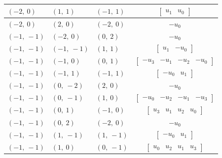 \documentclass[11pt]{article}
\theoremstyle{definition}
\begin{document}
\begin{longtable}{|l|l|l|c|}
    \hline
    $\left( -2, \  0\right)$ & $\left( 1, \  1\right)$ & $\left( -1, \  1\right)$ & $\left[\begin{matrix}u_{1} & u_{0}\end{matrix}\right]$ \\
    \hline
    $\left( -2, \  0\right)$ & $\left( 2, \  0\right)$ & $\left( -2, \  0\right)$ & $- u_{0}$ \\
    \hline
    $\left( -1, \  -1\right)$ & $\left( -2, \  0\right)$ & $\left( 0, \  2\right)$ & $- u_{0}$ \\
    \hline
    $\left( -1, \  -1\right)$ & $\left( -1, \  -1\right)$ & $\left( 1, \  1\right)$ & $\left[\begin{matrix}u_{1} & - u_{0}\end{matrix}\right]$ \\
    \hline
    $\left( -1, \  -1\right)$ & $\left( -1, \  0\right)$ & $\left( 0, \  1\right)$ & $\left[\begin{matrix}- u_{3} & - u_{1} & - u_{2} & - u_{0}\end{matrix}\right]$ \\
    \hline
    $\left( -1, \  -1\right)$ & $\left( -1, \  1\right)$ & $\left( -1, \  1\right)$ & $\left[\begin{matrix}- u_{0} & u_{1}\end{matrix}\right]$ \\
    \hline
    $\left( -1, \  -1\right)$ & $\left( 0, \  -2\right)$ & $\left( 2, \  0\right)$ & $- u_{0}$ \\
    \hline
    $\left( -1, \  -1\right)$ & $\left( 0, \  -1\right)$ & $\left( 1, \  0\right)$ & $\left[\begin{matrix}- u_{0} & - u_{2} & - u_{1} & - u_{3}\end{matrix}\right]$ \\
    \hline
    $\left( -1, \  -1\right)$ & $\left( 0, \  1\right)$ & $\left( -1, \  0\right)$ & $\left[\begin{matrix}u_{3} & u_{1} & u_{2} & u_{0}\end{matrix}\right]$ \\
    \hline
    $\left( -1, \  -1\right)$ & $\left( 0, \  2\right)$ & $\left( -2, \  0\right)$ & $- u_{0}$ \\
    \hline
    $\left( -1, \  -1\right)$ & $\left( 1, \  -1\right)$ & $\left( 1, \  -1\right)$ & $\left[\begin{matrix}- u_{0} & u_{1}\end{matrix}\right]$ \\
    \hline
    $\left( -1, \  -1\right)$ & $\left( 1, \  0\right)$ & $\left( 0, \  -1\right)$ & $\left[\begin{matrix}u_{0} & u_{2} & u_{1} & u_{3}\end{matrix}\right]$ \\

\end{longtable}
\end{document}
